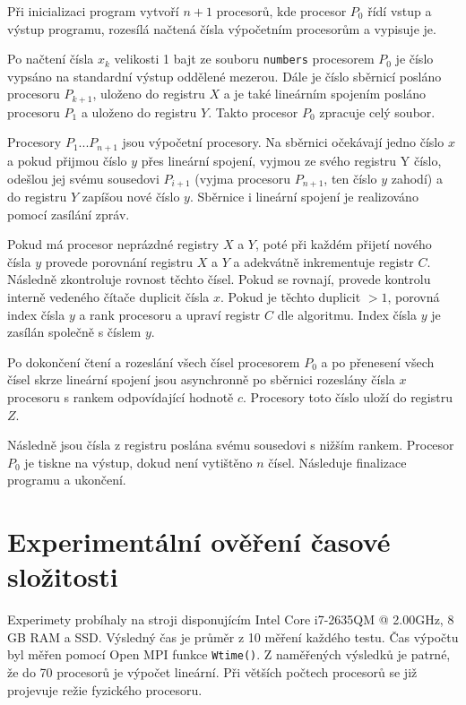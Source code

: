 \documentclass[11pt,a4paper]{article}
\begin{document}
Při inicializaci program vytvoří $n+1$ procesorů, kde procesor $P_0$ řídí vstup a výstup programu, rozesílá načtená čísla výpočetním procesorům a vypisuje je.

Po načtení čísla $x_k$ velikosti 1 bajt ze souboru \texttt{numbers} procesorem $P_0$ je číslo vypsáno na standardní výstup oddělené mezerou. Dále je číslo sběrnicí posláno procesoru $P_{k+1}$, uloženo do registru $X$ a je také lineárním spojením posláno procesoru $P_1$ a uloženo do registru $Y$. Takto procesor $P_0$ zpracuje celý soubor.

Procesory $P_1 ... P_{n+1}$ jsou výpočetní procesory. Na sběrnici očekávají jedno číslo $x$ a pokud přijmou číslo $y$ přes lineární spojení, vyjmou ze svého registru Y číslo, odešlou jej svému sousedovi $P_{i+1}$ (vyjma procesoru $P_{n+1}$, ten číslo $y$ zahodí) a do registru $Y$ zapíšou nové číslo $y$. Sběrnice i lineární spojení je realizováno pomocí zasílání zpráv.

Pokud má procesor neprázdné registry $X$ a $Y$, poté při každém přijetí nového čísla $y$ provede porovnání registru $X$ a $Y$ a adekvátně inkrementuje registr $C$. Následně zkontroluje rovnost těchto čísel. Pokud se rovnají, provede kontrolu interně vedeného čítače duplicit čísla $x$. Pokud je těchto duplicit $>1$, porovná index čísla $y$ a rank procesoru a upraví registr $C$ dle algoritmu. Index čísla $y$ je zasílán společně s číslem $y$.

Po dokončení čtení a rozeslání všech čísel procesorem $P_0$ a po přenesení všech čísel skrze lineární spojení jsou asynchronně po sběrnici rozeslány čísla $x$ procesoru s rankem odpovídající hodnotě $c$. Procesory toto číslo uloží do registru $Z$.

Následně jsou čísla z registru poslána svému sousedovi s nižším rankem. Procesor $P_0$ je tiskne na výstup, dokud není vytištěno $n$ čísel. Následuje finalizace programu a ukončení.

\section{Experimentální ověření časové složitosti}

Experimety probíhaly na stroji disponujícím Intel Core i7-2635QM @ 2.00GHz, 8 GB RAM a SSD. Výsledný čas je průměr z 10 měření každého testu. Čas výpočtu byl měřen pomocí Open MPI funkce \texttt{Wtime()}. Z naměřených výsledků je patrné, že do 70 procesorů je výpočet lineární. Při větších počtech procesorů se již projevuje režie fyzického procesoru.
\end{document}
